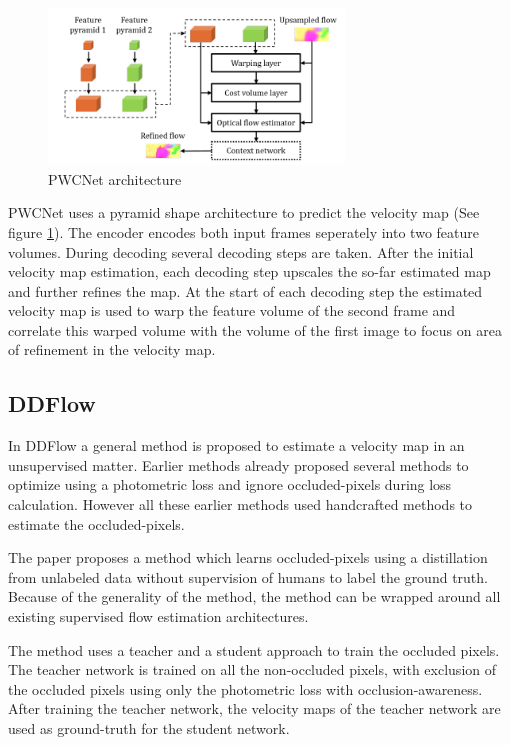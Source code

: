 \begin{figure}[h]
\centering
\includegraphics[width=0.7\textwidth]{images/pwcnet_approach}
\caption{PWCNet architecture}
\label{fig:pwc_approach}
\end{figure}

PWCNet uses a pyramid shape architecture to predict the velocity map (See figure \ref{fig:pwc_approach}). The encoder encodes both input frames seperately into two feature volumes. During decoding several decoding steps are taken. After the initial velocity map estimation, each decoding step upscales the so-far estimated map and further refines the map. At the start of each decoding step the estimated velocity map is used to warp the feature volume of the second frame and correlate this warped volume with the volume of the first image to focus on area of refinement in the velocity map.

\subsection{DDFlow}
In DDFlow \cite{liu_ddflow_2019} a general method is proposed to estimate a velocity map in an unsupervised matter. Earlier methods already proposed several methods to optimize using a photometric loss and ignore occluded-pixels during loss calculation. However all these earlier methods used handcrafted methods to estimate the occluded-pixels.

The paper proposes a method which learns occluded-pixels using a distillation from unlabeled data without supervision of humans to label the ground truth. Because of the generality of the method, the method can be wrapped around all existing supervised flow estimation architectures.

The method uses a teacher and a student approach to train the occluded pixels. The teacher network is trained on all the non-occluded pixels, with exclusion of the occluded pixels using only the photometric loss with occlusion-awareness. After training the teacher network, the velocity maps of the teacher network are used as ground-truth for the student network.

